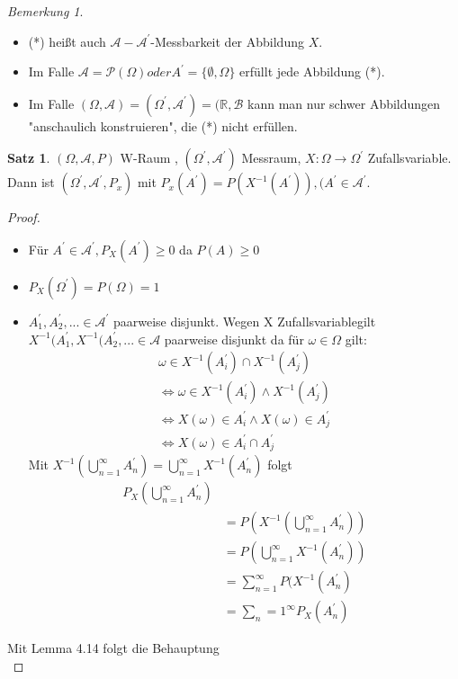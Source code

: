 \documentclass[a4paper,12pt,fleqn]{scrartcl}
\newcommand{\R}{\mathbb{R}}
\newcommand{\m}[1]{\mathcal{ #1 }}
\newcommand{\ZV}{Zufallsvariable}
\theoremstyle{definition}
\newtheorem{satz}[definition]{Satz}
\theoremstyle{plain}
\theoremstyle{remark}
\newtheorem*{bemerkung}{Bemerkung}
\begin{document}
\begin{bemerkung}
\begin{itemize}
\item (*) heißt auch $ \m{A} - \m{A}^\prime$-Messbarkeit der Abbildung $X$.
\item Im Falle $\m{A} = \m{P}( \Omega ) oder A^\prime = \{ \emptyset , \Omega \}$ erfüllt jede Abbildung (*).
\item Im Falle $( \Omega , \m{A}) = ( \Omega^\prime , \m{A}^\prime) = ( \R , \m{B}$ kann man nur schwer Abbildungen "anschaulich konstruieren", die (*) nicht erfüllen.
\end{itemize}
\end{bemerkung}
\begin{satz}
$( \Omega , \m{A} , P)$ W-Raum , $(\Omega^\prime, \m{A}^\prime)$ Messraum, $X : \Omega \rightarrow \Omega^\prime$ \ZV. Dann ist $( \Omega^\prime , \m{A}^\prime , P_x) $ mit $ P_x(A^\prime) = P(X^{-1}(A^\prime)), ( A^\prime \in \m{A}^\prime$.
\end{satz}
\begin{proof}
\begin{itemize}
\item Für $ A^\prime \in \m{A}^\prime, P_X(A^\prime) \geq 0 $ da $P(A) \geq 0$
\item $P_X(\Omega^\prime ) = P(\Omega) = 1$
\item $A_1^\prime, A_2^\prime, ... \in \m{A}^\prime $ paarweise disjunkt. Wegen X \ZV gilt $X^{-1}(A_1^\prime, X^{-1}(A_2^\prime,... \in \m{A}$ paarweise disjunkt da für $ \omega \in \Omega $ gilt: 
\begin{align*}
\omega \in X^{-1}(A_i^\prime) \cap X^{-1}(A_j^\prime) \\
\Leftrightarrow \omega \in X^{-1}(A_i^\prime) \land X^{-1}(A_j^\prime) \\
\Leftrightarrow X(\omega) \in A_i^\prime \land X(\omega) \in A_j^\prime \\
\Leftrightarrow X(\omega) \in A_i^\prime \cap A_j^\prime
\end{align*} 
Mit $X^{-1}( \bigcup_{n=1}^{ \infty }{A_n^\prime} ) = \bigcup_{n=1}^{ \infty }{X^{-1}(A_n^\prime)}$ folgt
\begin{align*}
P_X(\bigcup_{n=1}^{ \infty }{A_n^\prime}) \\
&= P(X^{-1} ( \bigcup_{n=1}^{ \infty }{A_n^\prime} )) \\
&= P(\bigcup_{n=1}^{ \infty }{X^{-1}(A_n^\prime)}) \\
&= \sum_{n=1}^{\infty}{P(X^{-1}(A_n^\prime)} \\
&= \sum_n=1^\infty {P_X(A_n^\prime)}
\end{align*}
\end{itemize}
Mit Lemma 4.14 folgt die Behauptung \\
\end{proof}
\end{document}
